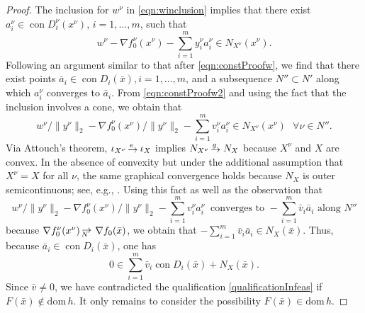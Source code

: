 \documentclass[smallextended,envcountsect]{svjour3}
\newcommand{\dom}[1]{\mathrm{dom}\, #1} %
\newcommand{\ind}{\iota}%
\DeclareMathOperator{\con}{con}
\newcommand{\eto}{\,{\lower 1pt\hbox{$\rightarrow$}}\kern -10pt
     \hbox{\raise 4pt \hbox{$\, \scriptstyle e$}}\hskip7pt}
\newcommand{\gto}{\,{\lower 1pt\hbox{$\rightarrow$}}\kern -10pt
     \hbox{\raise 4.5pt \hbox{$\, \scriptstyle g$}}\hskip7pt}
\def\Nto{\,{\raise 1pt\hbox{$\rightarrow$}}\kern -12pt
     \hbox{\lower 3pt \hbox{$\, \scriptstyle N$}}\hskip7pt}
\begin{document}
\begin{proof}
The inclusion for $w^\nu$ in \eqref{eqn:winclusion} implies that there exist $a_i^\nu \in \con D_i^\nu(x^\nu)$, $i=1, \dots, m$, such that 
\begin{equation}\label{eqn:constProofw2}
w^\nu - \nabla f_0^\nu(x^\nu) - \sum_{i=1}^m y_i^\nu a_i^\nu \in N_{X^\nu}(x^\nu).
\end{equation}
Following an argument similar to that after \eqref{eqn:constProofw}, we find that there exist points $\bar a_i \in \con D_i(\bar x), i=1, \dots, m$, and a subsequence $N''\subset N'$ along which $a_i^\nu$ converges to $\bar a_i$. From \eqref{eqn:constProofw2} and using the fact that the inclusion involves a cone, we obtain that  
\[
w^\nu/\|y^\nu\|_2 - \nabla f_0^\nu(x^\nu)/\|y^\nu\|_2 - \sum_{i=1}^m v_i^\nu a_i^\nu \in N_{X^\nu}(x^\nu) ~~~\forall \nu\in N''.
\]
Via Attouch's theorem, $\ind_{X^\nu} \eto \ind_X$ implies $N_{X^\nu} \gto N_X$ because $X^\nu$ and $X$ are convex. In the absence of convexity but under the additional assumption that $X^\nu = X$ for all $\nu$, the same graphical convergence holds because $N_X$ is outer semicontinuous; see, e.g., \cite[Proposition 7.22]{Royset_Wets_2021}. Using this fact as well as the observation that  
\[
w^\nu/\|y^\nu\|_2 - \nabla f_0^\nu(x^\nu)/\|y^\nu\|_2 - \sum_{i=1}^m v_i^\nu a_i^\nu ~\mbox{ converges to } - \sum_{i=1}^m \bar v_i \bar a_i \mbox{ along $N''$}
\]
because $\nabla f_0^\nu(x^\nu)\Nto \nabla f_0(\bar x)$, we obtain that $- \sum_{i=1}^m \bar v_i \bar a_i \in N_{X}(\bar x)$. Thus, because $\bar a_i \in \con D_i(\bar x)$, one has
\begin{equation}\label{eqn:contraQproof}
0 \in \sum_{i=1}^m \bar v_i \con D_i(\bar x) + N_{X}(\bar x).
\end{equation}
Since $\bar v \neq 0$, we have contradicted the qualification \eqref{qualificationInfeas} if $F(\bar x) \not\in \dom h$. It only remains to consider the possibility $F(\bar x) \in \dom h$. 


\end{proof}
\end{document}
